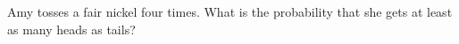 Amy tosses a fair nickel four times. What is the probability that she gets at least as many heads as tails?
